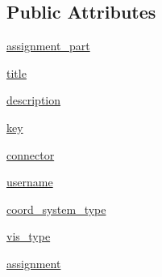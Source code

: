\subsection*{Public Attributes}
\begin{DoxyCompactItemize}
\item 
\hyperlink{classbridges_1_1bridges_1_1_bridges_a6fb18c021f26c0109c9b416c976f0903}{assignment\+\_\+part}
\item 
\hyperlink{classbridges_1_1bridges_1_1_bridges_ad939b2c56ddf76088fb9eb6aa0552e44}{title}
\item 
\hyperlink{classbridges_1_1bridges_1_1_bridges_ae7a9987daf7c1fbdb19d87954bb64aa0}{description}
\item 
\hyperlink{classbridges_1_1bridges_1_1_bridges_a7a071a40acc8903cb0dffc106160cb9d}{key}
\item 
\hyperlink{classbridges_1_1bridges_1_1_bridges_a1c02ee44e7a4a3ee2f7d9c7d7da7d09f}{connector}
\item 
\hyperlink{classbridges_1_1bridges_1_1_bridges_ac68532895ac5044fa175b673fb567a5e}{username}
\item 
\hyperlink{classbridges_1_1bridges_1_1_bridges_abcee636f07ecf127be16562f5b84e7f7}{coord\+\_\+system\+\_\+type}
\item 
\hyperlink{classbridges_1_1bridges_1_1_bridges_a5ca152bf3830e2be1f72247463916f82}{vis\+\_\+type}
\item 
\hyperlink{classbridges_1_1bridges_1_1_bridges_a2752e73a21f14efb9382217fcd431960}{assignment}
\end{DoxyCompactItemize}
